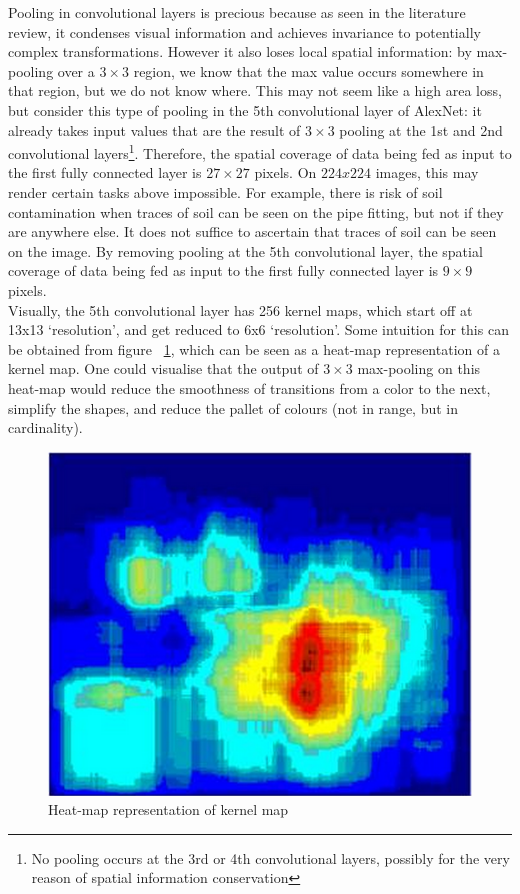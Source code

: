 \documentclass[a4paper,11pt]{article}
\begin{document}
Pooling in convolutional layers is precious because as seen in the literature review, it condenses visual information and achieves invariance to potentially complex transformations. However it also loses local spatial information: by max-pooling over a $3 \times 3$ region, we know that the max value occurs somewhere in that region, but we do not know where. This may not seem like a high area loss, but consider this type of pooling in the 5th convolutional layer of AlexNet: it already takes input values that are the result of $3 \times 3$ pooling at the 1st and 2nd convolutional layers\footnote{No pooling occurs at the 3rd or 4th convolutional layers, possibly for the very reason of spatial information conservation}. Therefore, the spatial coverage of data being fed as input to the first fully connected layer is $27\times27$ pixels. On $224x224$ images, this may render certain tasks above impossible. For example, there is risk of soil contamination when traces of soil can be seen on the pipe fitting, but not if they are anywhere else. It does not suffice to ascertain that traces of soil can be seen on the image. By removing pooling at the 5th convolutional layer, the spatial coverage of data being fed as input to the first fully connected layer is $9\times9$ pixels. \\

Visually, the 5th convolutional layer has 256 kernel maps, which start off at 13x13 `resolution', and get reduced to 6x6 `resolution'. Some intuition for this can be obtained from figure ~\ref{f60}, which can be seen as a heat-map representation of a kernel map. One could visualise that the output of $3 \times 3$ max-pooling on this heat-map would reduce the smoothness of transitions from a color to the next, simplify the shapes, and reduce the pallet of colours (not in range, but in cardinality). 

\begin{figure}[h!]
	\centering
	\includegraphics[scale=0.3]{images/max_pooling.png}
	\caption{Heat-map representation of kernel map}
    \label{f60}
\end{figure}
\end{document}
